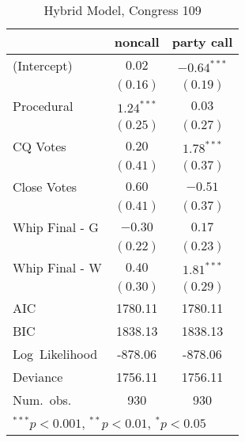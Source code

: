 \documentclass[12pt]{article}
\begin{document}
\begin{table}
	\begin{center}
		\begin{tabular}{l c c }
			\hline
			& noncall & party call \\
			\hline
			(Intercept)      & $0.02$       & $-0.64^{***}$ \\
			& $(0.16)$     & $(0.19)$      \\
			Procedural       & $1.24^{***}$ & $0.03$        \\
			& $(0.25)$     & $(0.27)$      \\
			CQ Votes    & $0.20$       & $1.78^{***}$  \\
			& $(0.41)$     & $(0.37)$      \\
			Close Votes & $0.60$       & $-0.51$       \\
			& $(0.41)$     & $(0.37)$      \\
			Whip Final - G     & $-0.30$      & $0.17$        \\
			& $(0.22)$     & $(0.23)$      \\
			Whip Final - W     & $0.40$       & $1.81^{***}$  \\
			& $(0.30)$     & $(0.29)$      \\
			\hline
			AIC              & 1780.11      & 1780.11       \\
			BIC              & 1838.13      & 1838.13       \\
			Log\ Likelihood  & -878.06      & -878.06       \\
			Deviance         & 1756.11      & 1756.11       \\
			Num.\ obs.       & 930          & 930           \\
			\hline
			\multicolumn{3}{l}{\scriptsize{$^{***}p<0.001$, $^{**}p<0.01$, $^*p<0.05$}}
		\end{tabular}
		\caption{Hybrid Model, Congress 109}
	\end{center}
\end{table}
\end{document}
